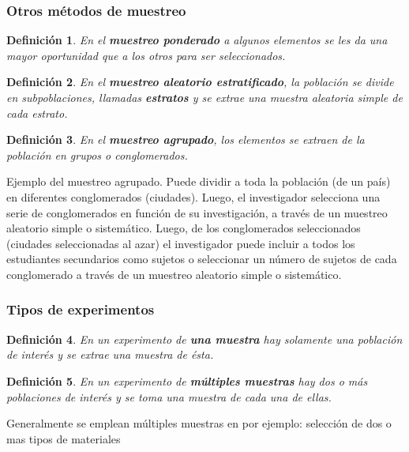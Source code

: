 \documentclass[10pt,a4paper]{book}
\newtheorem{defi}{\textbf{Definición}}
\begin{document}
\subsubsection{Otros métodos de muestreo}

\begin{defi}
	En el \textbf{muestreo ponderado} a algunos elementos se les da una mayor oportunidad que a los otros para ser seleccionados.
\end{defi}

\begin{defi}
	En el \textbf{muestreo aleatorio estratificado}, la población se divide en subpoblaciones, llamadas \textbf{estratos} y se extrae una muestra aleatoria simple de cada estrato.
\end{defi}

\begin{defi}
	En el \textbf{muestreo agrupado}, los elementos se extraen de la población en grupos o conglomerados.
\end{defi}
	
Ejemplo del muestreo agrupado. Puede dividir a toda la población (de un país) en diferentes conglomerados (ciudades). Luego, el investigador selecciona una serie de conglomerados en función de su investigación, a través de un muestreo aleatorio simple o sistemático. Luego, de los conglomerados seleccionados (ciudades seleccionadas al azar) el investigador puede incluir a todos los estudiantes secundarios como sujetos o seleccionar un número de sujetos de cada conglomerado a través de un muestreo aleatorio simple o sistemático.\\


\subsubsection{Tipos de experimentos}

\begin{defi}
	En un experimento de \textbf{una muestra} hay solamente una población de interés y se extrae una muestra de ésta.
\end{defi}

\begin{defi}
	En un experimento de \textbf{múltiples muestras} hay dos o más poblaciones de interés y se toma una muestra de cada una de ellas. 
\end{defi}

Generalmente se emplean múltiples muestras en por ejemplo: selección de dos o mas tipos de materiales\\
\end{document}
